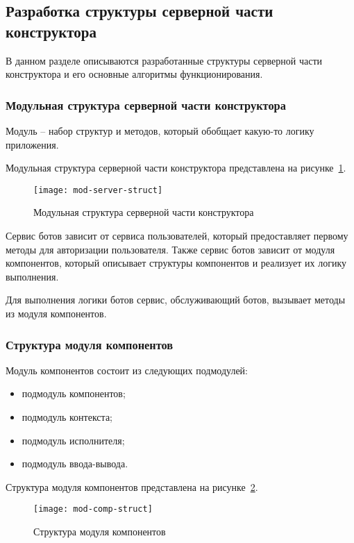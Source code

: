 
\subsection{Разработка структуры серверной части конструктора}


В данном разделе описываются разработанные структуры серверной части
конструктора и его основные алгоритмы функционирования.

\subsubsection{Модульная структура серверной части конструктора}

Модуль – набор структур и методов, который обобщает какую-то логику
приложения.

Модульная структура серверной части конструктора представлена на
рисунке~\ref{f:mod-server-struct}.

\begin{figure}[ht]
	\centering
	\texttt{[image: mod-server-struct]}
	\caption{Модульная структура серверной части конструктора}
	\label{f:mod-server-struct}
\end{figure}

Сервис ботов зависит от сервиса пользователей, который предоставляет
первому методы для авторизации пользователя. Также сервис ботов зависит
от модуля компонентов, который описывает структуры компонентов и
реализует их логику выполнения.

Для выполнения логики ботов сервис, обслуживающий ботов, вызывает
методы из модуля компонентов.

\subsubsection{Структура модуля компонентов}

Модуль компонентов состоит из следующих подмодулей:
\begin{itemize}
	\item подмодуль компонентов;
	\item подмодуль контекста;
	\item подмодуль исполнителя;
	\item подмодуль ввода-вывода.
\end{itemize}

Структура модуля компонентов представлена на рисунке~\ref{f:mod-comp-struct}.

\begin{figure}[ht]
	\centering
	\texttt{[image: mod-comp-struct]}
	\caption{Структура модуля компонентов}
	\label{f:mod-comp-struct}
\end{figure}

